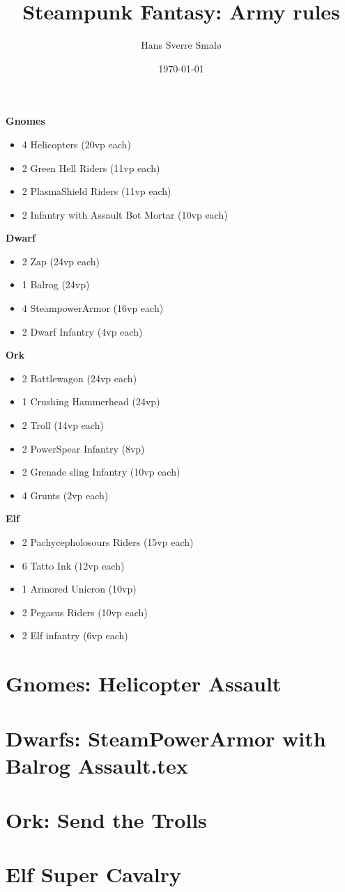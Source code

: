 \documentclass[a4,12pt, color, hyperref]{book}
\title{Steampunk Fantasy: Army rules}
\author{Hans Sverre Smalø}
\date{\today}
\begin{document}
\maketitle
\setcounter{tocdepth}{1}
\tableofcontents

{\bf Gnomes}
\begin{itemize}
\item 4 Helicopters (20vp each)
\item 2 Green Hell Riders (11vp each)
\item 2 PlasmaShield Riders (11vp each)
\item 2 Infantry with Assault Bot Mortar (10vp each)
\end{itemize}

{\bf Dwarf}
\begin{itemize}
\item 2 Zap (24vp each)
\item 1 Balrog (24vp)
\item 4 SteampowerArmor (16vp each)
\item 2 Dwarf Infantry (4vp each)
\end{itemize}

{\bf Ork}
\begin{itemize}
\item 2 Battlewagon (24vp each)
\item 1 Crushing Hammerhead (24vp)
\item 2 Troll (14vp each)
\item 2 PowerSpear Infantry (8vp)
\item 2 Grenade sling Infantry (10vp each)
\item 4 Grunts (2vp each)  
\end{itemize}  

{\bf Elf}
\begin{itemize}
\item 2 Pachycepholosours Riders (15vp each)
\item 6 Tatto Ink (12vp each)
\item 1 Armored Unicron (10vp)
\item 2 Pegasus Riders (10vp each)
\item 2 Elf infantry (6vp each)
\end{itemize}


\chapter{Gnomes: Helicopter Assault}


%
%

\chapter{Dwarfs: SteamPowerArmor with Balrog Assault.tex}


\chapter{Ork: Send the Trolls}


\chapter{Elf Super Cavalry}

\end{document}
